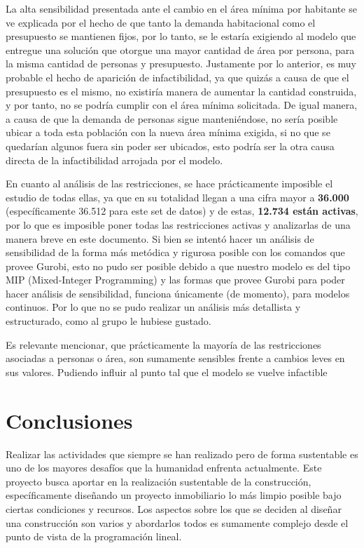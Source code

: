 \documentclass[letterpaper]{article}
\begin{document}
La alta sensibilidad presentada ante el cambio en el área mínima por habitante se ve explicada por el hecho de que tanto la demanda habitacional como el presupuesto se mantienen fijos, por lo tanto, se le estaría
exigiendo al modelo que entregue una solución que otorgue una mayor cantidad de área por persona, para la misma cantidad de personas y presupuesto. Justamente por lo anterior, es muy probable el hecho de aparición
de infactibilidad, ya que quizás a causa de que el presupuesto es el mismo, no existiría manera de aumentar la cantidad construida, y por tanto, no se podría cumplir con el área mínima solicitada. De igual manera,
a causa de que la demanda de personas sigue manteniéndose, no sería posible ubicar a toda esta población con la nueva área mínima exigida, si no que se quedarían algunos fuera sin poder ser ubicados, esto podría
ser la otra causa directa de la infactibilidad arrojada por el modelo. \newline \newline

En cuanto al análisis de las restricciones, se hace prácticamente imposible el estudio de todas ellas, ya que en su totalidad llegan a una cifra mayor a \textbf{36.000} (específicamente 36.512 para este set de datos)
y de estas, \textbf{12.734 están activas}, por lo que es imposible poner todas las restricciones activas y analizarlas de una manera breve en este documento. Si bien se intentó hacer un análisis de sensibilidad de la forma
más metódica y rigurosa posible con los comandos que provee Gurobi, esto no pudo ser posible debido a que nuestro modelo es del tipo MIP (Mixed-Integer Programming) y las formas que provee Gurobi para poder hacer
análisis de sensibilidad, funciona únicamente (de momento), para modelos continuos. Por lo que no se pudo realizar un análisis más detallista y estructurado, como al grupo le hubiese gustado. \newline \newline

Es relevante mencionar, que prácticamente la mayoría de las restricciones asociadas a personas o área, son sumamente sensibles frente a cambios leves en sus valores. Pudiendo influir al punto tal que el modelo
se vuelve infactible

\section{Conclusiones}
Realizar las actividades que siempre se han realizado pero de forma sustentable es uno de los mayores desafíos que la humanidad enfrenta actualmente. Este proyecto busca
aportar en la realización sustentable de la construcción, específicamente diseñando un proyecto inmobiliario lo más limpio posible bajo ciertas condiciones y recursos.
Los aspectos sobre los que se deciden al diseñar una construcción son varios y abordarlos todos es sumamente complejo desde el punto de vista de la programación lineal.\\
\end{document}
